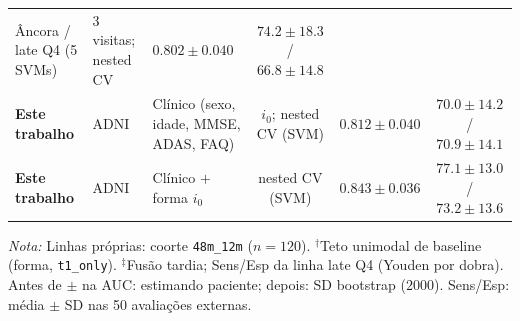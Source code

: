 \documentclass[review]{elsarticle}
\newcommand{\code}[1]{\texttt{#1}}
\begin{document}
\begin{table}
\begin{tabular}{@{}lllccc@{}}
		Âncora / late Q4 (5 SVMs) &
		3 visitas; nested CV &
		$\mathbf{0.802 \pm 0.040}$ & $\mathbf{74.2 \pm 18.3}$ / $\mathbf{66.8 \pm 14.8}$ \\
		\textbf{Este trabalho} & ADNI &
		Clínico (sexo, idade, MMSE, ADAS, FAQ) &
		$i_0$; nested CV (SVM) &
		$\mathbf{0.812 \pm 0.040}$ & $\mathbf{70.0 \pm 14.2}$ / $\mathbf{70.9 \pm 14.1}$ \\
		\textbf{Este trabalho} & ADNI &
		Clínico $+$ forma $i_0$ &
		nested CV (SVM) &
		$\mathbf{0.843 \pm 0.036}$ & $\mathbf{77.1 \pm 13.0}$ / $\mathbf{73.2 \pm 13.6}$ \\
		\bottomrule
	\end{tabular}
	\vspace{0.5em}
	\begin{flushleft}
		\scriptsize
		\textit{Nota:}
		Linhas próprias: coorte \code{48m\_12m} ($n=120$).
		$^{\dagger}$Teto unimodal de baseline (forma, \code{t1\_only}).
		$^{\ddagger}$Fusão tardia; Sens/Esp da linha late Q4 (Youden por dobra).
		Antes de $\pm$ na AUC: estimando paciente; depois: SD bootstrap ($2000$).
		Sens/Esp: média $\pm$ SD nas 50 avaliações externas.
	\end{flushleft}
\end{table}


\end{document}
